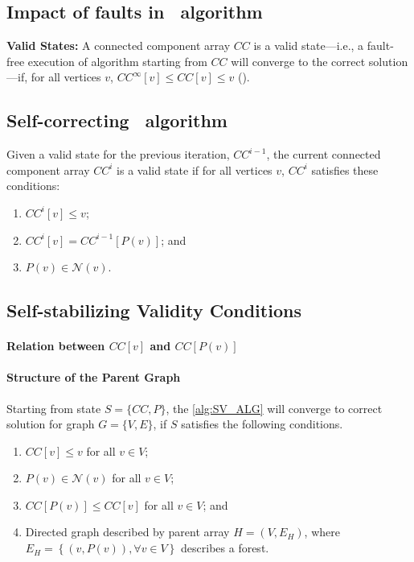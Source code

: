 




\subsection{Impact of faults in \sv~algorithm}

\begin{thm}{ \textbf{Valid States:}}
\label{thm:valid_cc}
A connected component array $CC$ is a valid state---i.e., a fault-free
execution of algorithm starting from $CC$ will converge to
the correct solution---if, for all vertices $v$, $CC^{\infty}[v]\leq CC[v]\leq v$ (\cite{sao2016sccc}).
\end{thm}



\subsection{Self-correcting \sv~algorithm}
\begin{thm}
\label{thm:sc-sv}
Given a valid state for the previous iteration, $CC^{i-1}$, the current connected component array $CC^{i}$ is a valid state if for all vertices $v$, $CC^{i}$ satisfies these conditions:
\begin{enumerate}
\item $CC^{i}[v] \leq v$; 
\item $CC^{i}[v] = CC^{i-1}[P(v)]$; and
\item $P(v) \in \mathcal{N}(v)$. %
\end{enumerate}
\end{thm}


\subsection{ Self-stabilizing Validity Conditions}

\paragraph{ Relation between $CC[v]$ and $CC[P(v)]$}

\paragraph{ Structure of the Parent Graph}



\begin{thm}
\label{thm:ss_valid}
Starting from state $S= \{CC,P \}$, the \cref{alg:SV_ALG} will converge to correct solution for graph $G=\{ V, E\}$, if $S$ satisfies the following conditions.
\begin{enumerate}
\item $CC[v]\leq v$  for all $v\in V$;
\item $P(v)\in\mathcal{N}(v)$ for all $v\in V$;
\item $CC[P(v)]\leq CC[v]$ for all $v\in V$; and 
\item Directed graph described by parent array $H=(V,E_{H})$, where $E_{H}=\left\{ (v,P(v)),\forall v\in V\right\} $
describes a forest. 
\end{enumerate}
\end{thm}